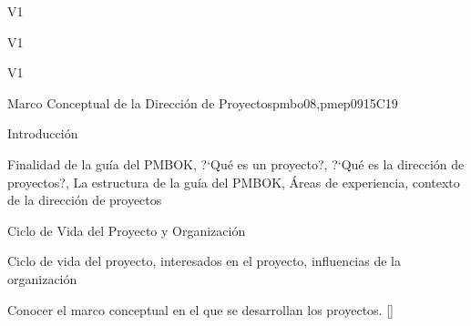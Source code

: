 \begin{syllabus}
\begin{outcomes}{V1}
\item {}
\item {}
\item {}
\end{outcomes}

\begin{specificoutcomes}{V1}
    \item {}
    \item {}
    \item {}
    \item {}
\end{specificoutcomes}

\begin{competences}{V1}
    \item {} 
    \item {}
    \item {}
    \item {}
    \item {}
    \item {}
    \item {}
    \item {}
\end{competences}

\begin{unit}{Marco Conceptual de la Dirección de Proyectos}{}{pmbo08,pmep09}{15}{C19}
\begin{topics}
      \item Introducción
       \item Finalidad de la guía del PMBOK, ?`Qué es un proyecto?, ?`Qué es la dirección de proyectos?, La estructura de la guía del PMBOK, Áreas de experiencia, contexto de la dirección de proyectos
      \item Ciclo de Vida del Proyecto y Organización
       \item Ciclo de vida del proyecto, interesados en el proyecto, influencias de la organización
   \end{topics}

   \begin{learningoutcomes}
      \item Conocer el marco conceptual en el que se desarrollan los proyectos. [\Usage]
   \end{learningoutcomes}
\end{unit}


\end{syllabus}
